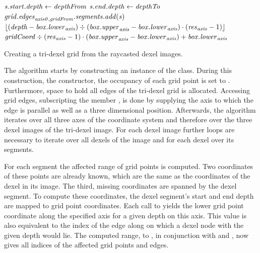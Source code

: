 \begin{algorithm}
\begin{algorithmic}[1]
									\State $\mathit{s}.\mathit{start}.\mathit{depth} \gets \mathit{depthFrom}$
								\EndIf
									\State $\mathit{s}.\mathit{end}.\mathit{depth} \gets \mathit{depthTo}$
								\EndIf
								\State $\mathit{grid}.\mathit{edges}_{\mathit{axis0}, \mathit{gridFrom}}.\mathit{segments}.\mathit{add}(\mathit{s})$ \label{line:grid_edge_insertion}
							\EndFor
						\EndFor
					\EndFor
				\EndFor
			\EndFor
		\EndFunction
		\\
			\State \Return $\lfloor(\mathit{depth} - \mathit{box}.\mathit{lower}_{\mathit{axis}}) \div (\mathit{box}.\mathit{upper}_{\mathit{axis}} - \mathit{box}.\mathit{lower}_{\mathit{axis}}) \cdot (\mathit{res}_{\mathit{axis}} - 1)\rfloor$
		\EndFunction
		\\
			\State \Return $\mathit{gridCoord} \div (\mathit{res}_{\mathit{axis}} - 1) \cdot (\mathit{box}.\mathit{upper}_{\mathit{axis}} - \mathit{box}.\mathit{lower}_{\mathit{axis}}) + \mathit{box}.\mathit{lower}_{\mathit{axis}}$
		\EndFunction
	\end{algorithmic}
	\caption{
		Creating a tri-dexel grid from the raycasted dexel images.
	}
	\label{alg:tri_dexel_grid_generation}
\end{algorithm}
%
The algorithm starts by constructing an instance of the  class.
During this construction, \ie the constructor, the occupancy of each grid point is set to \False.
Furthermore, space to hold all edges of the tri-dexel grid is allocated.
Accessing grid edges, \ie subscripting the member , is done by supplying the axis to which the edge is parallel as well as a three dimensional position.
Afterwards, the algorithm iterates over all three axes of the coordinate system and therefore over the three dexel images of the tri-dexel image.
For each dexel image further loops are necessary to iterate over all dexels of the image and for each dexel over its segments.

For each segment the affected range of grid points is computed.
Two coordinates of these points are already known, which are the same as the coordinates of the dexel in its image.
The third, missing coordinates are spanned by the dexel segment.
To compute these coordinates, the dexel segment's start and end depth are mapped to grid point coordinates.
Each call to  yields the lower grid point coordinate along the specified axis for a given depth on this axis.
This value is also equivalent to the index of the edge along  on which a dexel node with the given depth would lie.
The computed range,  to , in conjunction with  and , now gives all indices of the affected grid points and edges.


